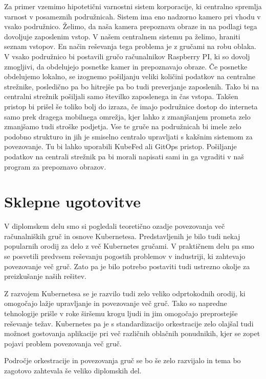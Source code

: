\documentclass[a4paper, 12pt]{book}
\begin{document}
Za primer vzemimo hipotetični varnostni sistem korporacije, ki centralno spremlja varnost v posameznih podružnicah.
Sistem ima eno nadzorno kamero pri vhodu v vsako podružnico.
Želimo, da naša kamera prepoznava obraze in na podlagi tega dovoljuje zaposlenim vstop.
V našem centralnem sistemu pa želimo, hraniti seznam vstopov.
En način reševanja tega problema je z gručami na robu oblaka.
V vsako podružnico bi postavili gručo računalnikov Raspberry PI, ki so dovolj zmogljivi, da obdelujejo posnetke kamer in prepoznavajo obraze.
Če posnetke obdelujemo lokalno, se izognemo pošiljanju veliki količini podatkov na centralne strežnike, posledično pa bo hitrejše pa bo tudi preverjanje zaposlenih.
Tako bi na centralni strežnik pošiljali samo številko zaposlenega in čas vstopa.
Takšen pristop bi prišel še toliko bolj do izraza, če imajo podružnice dostop do interneta samo prek dragega mobilnega omrežja, kjer lahko z zmanjšanjem prometa zelo zmanjšamo tudi stroške podjetja.
Vse te gruče na podružnicah bi imele zelo podobno strukturo in jih je smiselno centralo upravljati s kakšnim sistemom za povezovanje. 
Tu bi lahko uporabili KubeFed ali GitOps pristop.
Pošiljanje podatkov na centrali strežnik pa bi morali napisati sami in ga vgraditi v naš program za prepoznavo obrazov.
\chapter{Sklepne ugotovitve}
  V diplomskem delu smo si pogledali teoretično ozadje povezovanja več računalniških gruč in osnove Kubernetesa.
Predstavljenih je bilo tudi nekaj popularnih orodij za delo z več Kubernetes gručami.
V praktičnem delu pa smo se posvetili predvsem reševanju pogostih problemov v industriji, ki zahtevajo povezovanje več gruč.
Zato pa je bilo potrebo postaviti tudi ustrezno okolje za preizkušanje naših rešitev.

Z razvojem Kubernetesa se je razvilo tudi zelo veliko odprtokodnih orodij, ki omogočajo lažje upravljanje in povezovanje več gruč.
Tako so napredne tehnologije prišle v roke širšemu krogu ljudi in jim omogočajo preprostejše reševanje težav.
Kubernetes pa je s standardizacijo orkestracije zelo olajšal tudi možnost gostovanja aplikacije pri več različnih oblačnih ponudnikih, kjer se zopet pojavi problem povezovanja več gruč.

Področje orkestracije in povezovanja gruč se bo še zelo razvijalo in tema bo zagotovo zahtevala še veliko diplomskih del.

\newpage %
\newpage %
\newpage %
\newpage %
\ \\
\clearpage
{}


\end{document}
